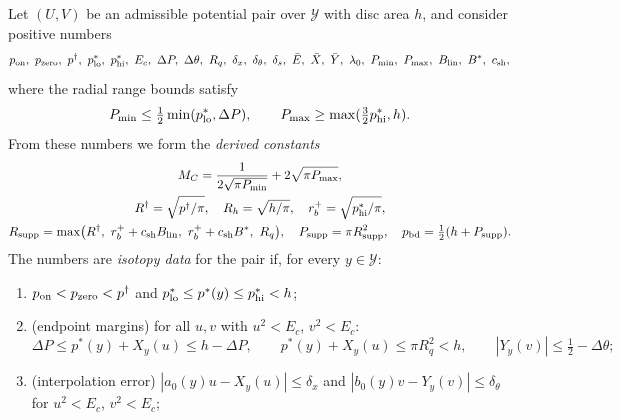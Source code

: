 \begin{definition}\label{I:def:pln-isotopy-data}
Let $(U,V)$ be an admissible potential pair over $\mathcal Y$ with disc area $h$, and consider positive numbers
\[
 p_{\rm on},\ p_{\rm zero},\ p^\dagger,\ p^*_{\rm lo},\ p^*_{\rm hi},\ E_c,\ \Delta P,\ \Delta\theta,\ R_q,\ \delta_x,\ \delta_\theta,\
 \delta_s,\ \bar E,\ \bar X,\ \bar Y,\ \lambda_0,\ P_{\min},\ P_{\max},\ B_{\rm lin},\ B^*,\ c_{\rm sh},
\]
where the radial range bounds satisfy
\[
 P_{\min}\le\tfrac12\min(p^*_{\rm lo},\Delta P),\qquad P_{\max}\ge\max(\tfrac32p^*_{\rm hi},h).
\]
From these numbers we form the \emph{derived constants}
\begin{gather*}
 M_C=\frac1{2\sqrt{\pi P_{\min}}}+2\sqrt{\pi P_{\max}},\\
 R^\dagger=\sqrt{p^\dagger/\pi},\quad R_h=\sqrt{h/\pi},\quad r_b^+=\sqrt{p^*_{\rm hi}/\pi},\\
 R_{\rm supp}=\max\bigl(R^\dagger,\ r_b^++c_{\rm sh}B_{\rm lin},\ r_b^++c_{\rm sh}B^*,\ R_q\bigr),\quad P_{\rm supp}=\pi R_{\rm supp}^2,\quad
 p_{\rm bd}=\tfrac12(h+P_{\rm supp}).
\end{gather*}
The numbers are \emph{isotopy data} for the pair if, for every $y\in\mathcal Y$:
\begin{enumerate}[label=(D\arabic*)]
\item\label{I:it:pln-D1} $p_{\rm on}<p_{\rm zero}<p^\dagger$ and $p^*_{\rm lo}\le p^*(y)\le p^*_{\rm hi}<h$;
\item\label{I:it:pln-D2} (endpoint margins) for all $u,v$ with $u^2<E_c$, $v^2<E_c$:
 \[
  \Delta P\le p^*(y)+X_y(u)\le h-\Delta P,\qquad p^*(y)+X_y(u)\le\pi R_q^2<h,\qquad |Y_y(v)|\le\tfrac12-\Delta\theta ;
 \]
\item\label{I:it:pln-D3} (interpolation error) $|a_0(y)u-X_y(u)|\le\delta_x$ and $|b_0(y)v-Y_y(v)|\le \delta_\theta$ for $u^2<E_c$, $v^2<E_c$;

\end{enumerate}
\end{definition}
